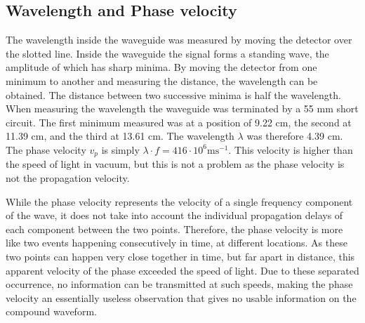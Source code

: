 \documentclass[11pt,a4paper]{article}
\begin{document}
\subsection{Wavelength and Phase velocity}
The wavelength inside the waveguide was measured by moving the detector over the slotted line. Inside the waveguide the signal forms a standing wave, the amplitude of which has sharp minima. By moving the detector from one minimum to another and measuring the distance, the wavelength can be obtained. The distance between two successive minima is half the wavelength. When measuring the wavelength the waveguide was terminated by a 55 mm short circuit. The first minimum measured was at a position of 9.22 cm, the second at 11.39 cm, and the third at 13.61 cm. The wavelength $\lambda$ was therefore 4.39 cm.\\
The phase velocity $v_{p}$ is simply $\lambda \cdot f = 416\cdot 10^{6} \mathrm{ms^{-1}}$. This velocity is higher than the speed of light in vacuum, but this is not a problem as the phase velocity is not the propagation velocity. 

While the phase velocity represents the velocity of a single frequency component of the wave, it does not take into account the individual propagation delays of each component between the two points. Therefore, the phase velocity is more like two events happening consecutively in time, at different locations. As these two points can happen very close together in time, but far apart in distance, this apparent velocity of the phase exceeded the speed of light. Due to these separated occurrence, no information can be transmitted at such speeds, making the phase velocity an essentially useless observation that gives no usable information on the compound waveform.
\end{document}
